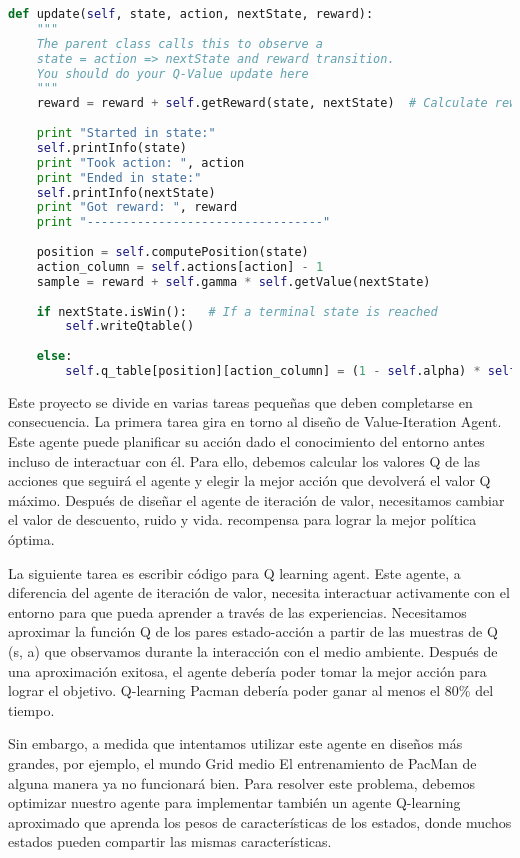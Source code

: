 \documentclass[11pt]{exam}
\begin{document}
\begin{lstlisting}[language=python, basicstyle=\footnotesize]
def update(self, state, action, nextState, reward):
	"""
	The parent class calls this to observe a
	state = action => nextState and reward transition.
	You should do your Q-Value update here
	"""
	reward = reward + self.getReward(state, nextState)  # Calculate reward
	
	print "Started in state:"
	self.printInfo(state)
	print "Took action: ", action
	print "Ended in state:"
	self.printInfo(nextState)
	print "Got reward: ", reward
	print "---------------------------------"	
	
	position = self.computePosition(state)
	action_column = self.actions[action] - 1
	sample = reward + self.gamma * self.getValue(nextState)
	
	if nextState.isWin():   # If a terminal state is reached
		self.writeQtable()
	
	else:
		self.q_table[position][action_column] = (1 - self.alpha) * self.q_table[position][action_column] + self.alpha * sample
\end{lstlisting}

Este proyecto se divide en varias tareas pequeñas que deben completarse en consecuencia. La primera tarea gira en torno al diseño de Value-Iteration Agent. Este agente puede planificar su acción dado el conocimiento del entorno antes incluso de interactuar con él. Para ello, debemos calcular los valores Q de las acciones que seguirá el agente y elegir la mejor acción que devolverá el valor Q máximo. Después de diseñar el agente de iteración de valor, necesitamos cambiar el valor de descuento, ruido y vida.
recompensa para lograr la mejor política óptima.

La siguiente tarea es escribir código para Q learning agent. Este agente, a diferencia del agente de iteración de valor, necesita interactuar activamente con el entorno para que pueda aprender a través de las experiencias. Necesitamos aproximar la función Q de los pares estado-acción a partir de las muestras de Q (s, a) que observamos durante la interacción con el medio ambiente. Después de una aproximación exitosa, el agente debería poder tomar la mejor acción para lograr el objetivo. Q-learning Pacman debería poder ganar al menos el 80\% del tiempo.

Sin embargo, a medida que intentamos utilizar este agente en diseños más grandes, por ejemplo, el mundo Grid medio
El entrenamiento de PacMan de alguna manera ya no funcionará bien. Para resolver este problema, debemos
optimizar nuestro agente para implementar también un agente Q-learning aproximado que aprenda los pesos de
características de los estados, donde muchos estados pueden compartir las mismas características.
\end{document}
